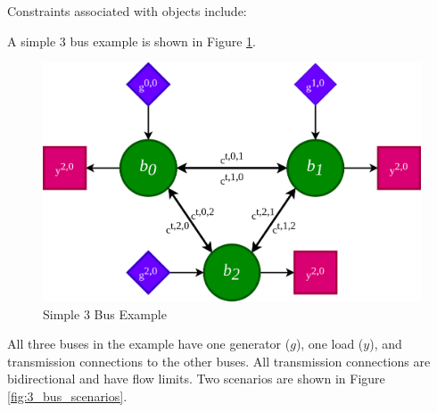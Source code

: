 \documentclass[12pt]{article}
\begin{document}
Constraints associated with objects include:




A simple 3 bus example is shown in Figure \ref{fig:3_bus_0}.

\begin{figure}[H]
	\centering
	\includegraphics[width=\linewidth*2/3]{figs/3_bus_0.png}
	\caption{Simple 3 Bus Example}
	\label{fig:3_bus_0}
\end{figure}

All three buses in the example have one generator ($g$), one load ($y$), and transmission connections to the other buses. All transmission connections are bidirectional and have flow limits. Two scenarios are shown in Figure \ref{fig:3_bus_scenarios}.




 
\end{document}
